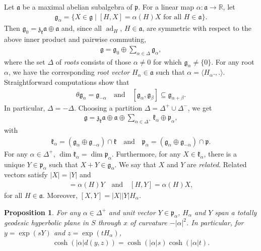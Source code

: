 \documentclass[12pt,a4paper]{amsart}
\newcounter{alph}
\numberwithin{equation}{section}
\newtheorem{prop}[equation]{Proposition}
\theoremstyle{definition}
\DeclareMathOperator{\ad}{ad}
\def\R{\mathbb R}
\def\la{\langle}
\def\ra{\rangle}
\begin{document}
Let $\mathfrak a$ be a maximal abelian subalgebra of $\mathfrak p$.
For a linear map $\alpha\colon\mathfrak a\to\R$, let
\begin{align*}
	\mathfrak g_\alpha = \{ X\in\mathfrak g \mid \text{$[H,X] = \alpha(H)X$ for all $H\in\mathfrak a$} \}. 
\end{align*}
Then $\mathfrak g_0=\mathfrak z_{\mathfrak k}\mathfrak a \oplus \mathfrak a$ and,
since all $\ad_H$, $H\in\mathfrak a$, are symmetric with respect to the above inner product and pairwise commuting,
\begin{align*}
	\mathfrak g = \mathfrak g_0 \oplus \sum_{\alpha\in\Delta} \mathfrak g_\alpha,
\end{align*}
where the set $\Delta$ of \emph{roots}  consists of those $\alpha\ne0$ for which $\mathfrak g_\alpha\ne\{0\}$.
For any root $\alpha$, we have the corresponding \emph{root vector} $H_\alpha\in\mathfrak a$ such that $\alpha=\la H_\alpha.,.\ra$.
Straightforward computations show that
\begin{align*}
	\theta \mathfrak g_\alpha = \mathfrak g_{-\alpha}
	\quad\text{and}\quad 
	[\mathfrak g_\alpha,\mathfrak g_\beta] \subseteq \mathfrak g_{\alpha+\beta}.
\end{align*}
In particular, $\Delta=-\Delta$.
Choosing a partition $\Delta=\Delta^+\cup\Delta^-$, we get
\begin{align*}
	\mathfrak g = \mathfrak z_{\mathfrak k}\mathfrak a \oplus \mathfrak a
	\oplus \sum_{\alpha\in\Delta^+} \mathfrak k_\alpha \oplus \mathfrak p_\alpha,
\end{align*}
with
\begin{align*}
	\mathfrak k_\alpha = (\mathfrak g_\alpha \oplus \mathfrak g_{-\alpha}) \cap \mathfrak k
	\quad\text{and}\quad
	\mathfrak p_\alpha = (\mathfrak g_\alpha \oplus \mathfrak g_{-\alpha}) \cap \mathfrak p.
\end{align*}
For any $\alpha\in\Delta^+$, $\dim\mathfrak k_\alpha=\dim\mathfrak p_\alpha$.
Furthermore, for any $X\in\mathfrak k_\alpha$,
there is a unique $Y\in\mathfrak p_\alpha$ such that $X+Y\in\mathfrak g_\alpha$.
We say that $X$ and $Y$ are \emph{related}.
Related vectors satisfy $|X|=|Y|$ and
\begin{align*}
	[H,X]=\alpha(H)Y \quad\text{and}\quad [H,Y]=\alpha(H)X,
\end{align*}
for all $H\in\mathfrak a$.
Moreover, $[X,Y]=|X||Y|H_\alpha$.

\begin{prop}\label{hypla}
For any $\alpha\in\Delta^+$ and unit vector $Y\in\mathfrak p_\alpha$,
$H_\alpha$ and $Y$ span a totally geodesic hyperbolic plane in $S$ through $x$ of curvature $-|\alpha|^2$.
In particular, for $y=\exp(sY)$ and $z=\exp(tH_\alpha)$,
\begin{align*}
	\cosh(|\alpha|d(y,z)) = \cosh(|\alpha|s)\cosh(|\alpha|t).
\end{align*}
\end{prop}
\end{document}
